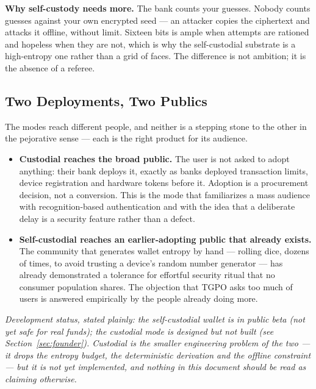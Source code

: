 \noindent\textbf{Why self-custody needs more.} The bank counts your guesses.
Nobody counts guesses against your own encrypted seed --- an attacker copies the
ciphertext and attacks it offline, without limit. Sixteen bits is ample when
attempts are rationed and hopeless when they are not, which is why the
self-custodial substrate is a high-entropy one rather than a grid of faces. The
difference is not ambition; it is the absence of a referee.

\subsection{Two Deployments, Two Publics}

The modes reach different people, and neither is a stepping stone to the other in
the pejorative sense --- each is the right product for its audience.

\begin{itemize}
  \item \textbf{Custodial reaches the broad public.} The user is not asked to
        adopt anything: their bank deploys it, exactly as banks deployed
        transaction limits, device registration and hardware tokens before it.
        Adoption is a procurement decision, not a conversion. This is the mode
        that familiarizes a mass audience with recognition-based authentication
        and with the idea that a deliberate delay is a security feature rather
        than a defect.
  \item \textbf{Self-custodial reaches an earlier-adopting public that already
        exists.} The community that generates wallet entropy by hand --- rolling
        dice, dozens of times, to avoid trusting a device's random number
        generator --- has already demonstrated a tolerance for effortful
        security ritual that no consumer population shares. The objection that
        TGPO asks too much of users is answered empirically by the people
        already doing more.
\end{itemize}

\noindent\textit{Development status, stated plainly: the self-custodial wallet is in
public beta (not yet safe for real funds); the custodial mode is designed but not built
(see Section~\ref{sec:founder}). Custodial is the
smaller engineering problem of the two --- it drops the entropy budget, the
deterministic derivation and the offline constraint --- but it is not yet
implemented, and nothing in this document should be read as claiming otherwise.}

